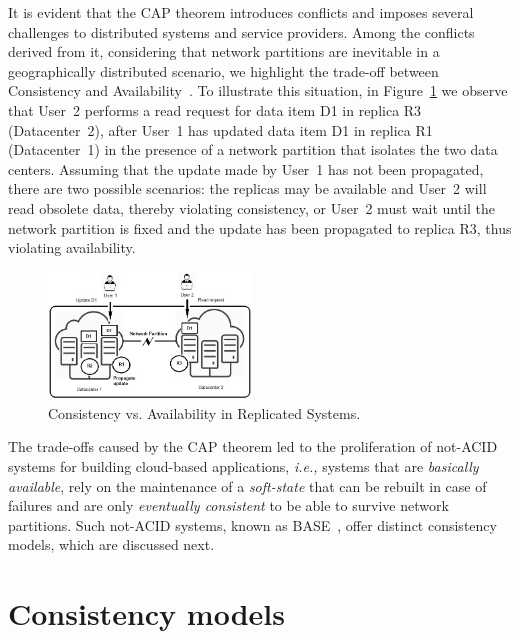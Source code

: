 It is evident that 
the CAP theorem introduces conflicts and imposes several challenges to dis\-trib\-uted systems and service providers. Among the conflicts derived from it, considering that network partitions are inevitable in a geographically distributed scenario, we highlight the trade-off between Consistency and Availability~\cite{gilbert2012perspectives}. 
To illustrate this situation, in Figure~\ref{fig:figure1} we observe that User~2 performs a read request for data item D1 in replica R3 (Da\-ta\-center~2), after User~1 has updated data item D1 in replica R1 (Datacenter~1) in the presence of a network partition that isolates the two data centers. Assuming that the update made by User~1 has not been propagated, there are two possible scenarios: the replicas may be available and User~2 will read obsolete data, thereby violating consistency, or User~2 must wait until the network partition is fixed and the update has been propagated to replica R3, thus violating availability.


\begin{figure}[h]
	\vspace{-3mm}
\centering	\includegraphics[width=0.48\textwidth]{fig1.png}
	\caption{Consistency vs. Availability in Replicated Systems.}
	\label{fig:figure1}
\end{figure}

The trade-offs caused by the CAP theorem led to the proliferation of not-ACID systems for building cloud-based applications, {\it i.e.,} systems that are {\it basically available}, rely on the maintenance of a {\it soft-state} that can be rebuilt in case of failures and are only {\it eventually consistent} to be able to survive network partitions. Such not-ACID systems, known as BASE~\cite{sosp1997base}, offer distinct consistency models, which are discussed next.

\section{Consistency models}


